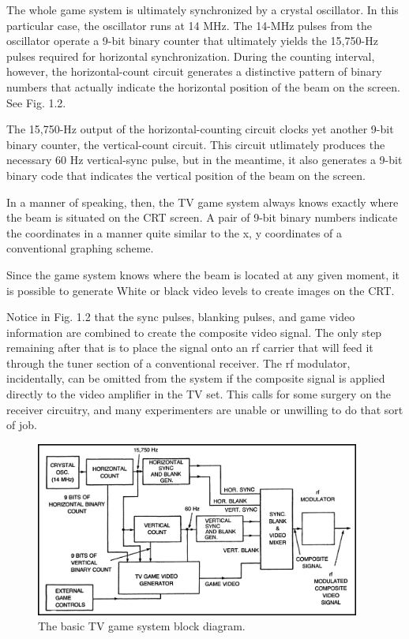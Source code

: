 \documentclass[11pt]{book}              %
\begin{document}
The whole game system is ultimately synchronized by a crystal oscillator. In this particular case, the oscillator runs at 14 MHz. The 14-MHz pulses from the oscillator operate a 9-bit binary counter that ultimately yields the 15,750-Hz pulses required for horizontal synchronization. During the counting interval, however, the horizontal-count circuit generates a distinctive pattern of binary numbers that actually indicate the horizontal position of the beam on the screen. See Fig. 1.2.

The 15,750-Hz output of the horizontal-counting circuit clocks yet another 9-bit binary counter, the vertical-count circuit. This circuit utlimately produces the necessary 60 Hz vertical-sync pulse, but in the meantime, it also generates a 9-bit binary code that indicates the vertical position of the beam on the screen.

In a manner of speaking, then, the TV game system always knows exactly where the beam is situated on the CRT screen. A pair of 9-bit binary numbers indicate the coordinates in a manner quite similar to the x, y coordinates of a conventional graphing scheme.

Since the game system knows where the beam is located at any given moment, it is possible to generate White or black video levels to create images on the CRT.

Notice in Fig. 1.2 that the sync pulses, blanking pulses, and game video information are combined to create the composite video signal. The only step remaining after that is to place the signal onto an rf carrier that will feed it through the tuner section of a conventional receiver. The rf modulator, incidentally, can be omitted from the system if the composite signal is applied directly to the video amplifier in the TV set. This calls for some surgery on the receiver circuitry, and many experimenters are unable or unwilling to do that sort of job.

\begin{figure}
  \centering
  \includegraphics[width=0.95\textwidth]{images/fig1-2}
  \caption{The basic TV game system block diagram.}
\end{figure}
\end{document}

